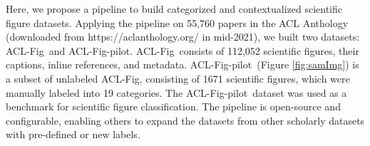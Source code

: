 \documentclass{article}
\newcommand{\scifig}{{\sc ACL-Fig}}
\newcommand{\scifigp}{{\sc ACL-Fig-pilot}}
\begin{document}
Here, we propose a pipeline to build categorized and contextualized scientific figure datasets. Applying the pipeline on 55,760 papers in the ACL Anthology (downloaded from https://aclanthology.org/ in mid-2021), we built two datasets: \scifig\ and \scifigp. \scifig\ consists of 112,052 scientific figures, their captions, inline references, and  metadata. \scifigp\ (Figure \ref{fig:samImg}) is a subset of unlabeled \scifig, consisting of 1671 scientific figures, which were manually labeled into 19 categories. The \scifigp\ dataset was used as a benchmark for scientific figure classification. The pipeline is open-source and configurable, enabling others to expand the datasets  from other scholarly datasets with pre-defined or new labels. 
\end{document}
